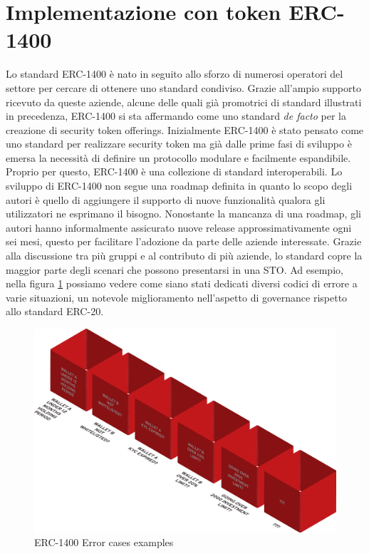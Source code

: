 \section{Implementazione con token ERC-1400}
Lo standard ERC-1400 è nato in seguito allo sforzo di numerosi operatori del settore per cercare di ottenere uno standard condiviso. Grazie all'ampio supporto ricevuto da queste aziende, alcune delle quali già promotrici di standard illustrati in precedenza, ERC-1400 si sta affermando come uno standard \textit{de facto} per la creazione di security token offerings.
Inizialmente ERC-1400 è stato pensato come uno standard per realizzare security token ma già dalle prime fasi di sviluppo è emersa la necessità di definire un protocollo modulare e facilmente espandibile. Proprio per questo, ERC-1400 è una collezione di standard interoperabili. Lo sviluppo di ERC-1400 non segue una roadmap definita in quanto lo scopo degli autori è quello di aggiungere il supporto di nuove funzionalità qualora gli utilizzatori ne esprimano il bisogno. Nonostante la mancanza di una roadmap, gli autori hanno informalmente assicurato nuove release approssimativamente ogni sei mesi, questo per facilitare l'adozione da parte delle aziende interessate.  
Grazie alla discussione tra più gruppi e al contributo di più aziende, lo standard copre la maggior parte degli scenari che possono presentarsi in una STO. Ad esempio, nella figura \ref{fig:1400} possiamo vedere come siano stati dedicati diversi codici di errore a varie situazioni, un notevole miglioramento nell'aspetto di governance rispetto allo standard ERC-20. 
\begin{figure}[H]
  \includegraphics[width=\linewidth]{1400.png}
  \caption{ERC-1400 Error cases examples}
  \label{fig:1400}
\end{figure}

